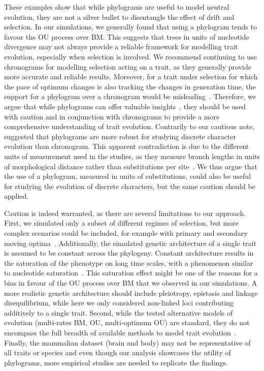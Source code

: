 \documentclass{article}
\begin{document}
These examples show that while phylograms are useful to model neutral evolution, they are not a silver bullet to disentangle the effect of drift and selection.
In our simulations, we generally found that using a phylogram tends to favour the OU process over BM.
This suggests that trees in units of nucleotide divergence may not always provide a reliable framework for modelling trait evolution, especially when selection is involved.
We recommend continuing to use chronograms for modelling selection acting on a trait, as they generally provide more accurate and reliable results.
Moreover, for a trait under selection for which the pace of optimum changes is also tracking the changes in generation time, the support for a phylogram over a chronogram would be misleading~\citep{litsios_effects_2012}.
Therefore, we argue that while phylograms can offer valuable insights~\citep{wilson_chronogram_2022}, they should be used with caution and in conjunction with chronograms to provide a more comprehensive understanding of trait evolution.
Contrarily to our cautious note, \citet{wilson_chronogram_2022} suggested that phylograms are more robust for studying discrete character evolution than chronogram.
This apparent contradiction is due to the different units of measurement used in the studies, as they measure branch lengths in units of morphological distance rather than substitutions per site~\citep{wilson_chronogram_2022}.
We thus argue that the use of a phylogram, measured in units of substitutions, could also be useful for studying the evolution of discrete characters, but the same caution should be applied.

Caution is indeed warranted, as there are several limitations to our approach.
First, we simulated only a subset of different regimes of selection, but more complex scenarios could be included, for example with primary and secondary moving optima~\citep{hansen_three_2024}.
Additionally, the simulated genetic architecture of a single trait is assumed to be constant across the phylogeny.
Constant architecture results in the saturation of the phenotype on long time scales, with a phenomenon similar to nucleotide saturation~\citep{latrille_detecting_2024}.
This saturation effect might be one of the reasons for a bias in favour of the OU process over BM that we observed in our simulations.
A more realistic genetic architecture should include pleiotropy, epistasis and linkage disequilibrium, while here we only considered non-linked loci contributing additively to a single trait.
Second, while the tested alternative models of evolution (multi-rates BM, OU, multi-optimum OU) are standard, they do not encompass the full breadth of available methods to model trait evolution~\citep{pennell_geiger_2014, hohna_revbayes_2016}.
Finally, the mammalian dataset (brain and body) may not be representative of all traits or species and even though our analysis showcases the utility of phylograms, more empirical studies are needed to replicate the findings.
\end{document}

